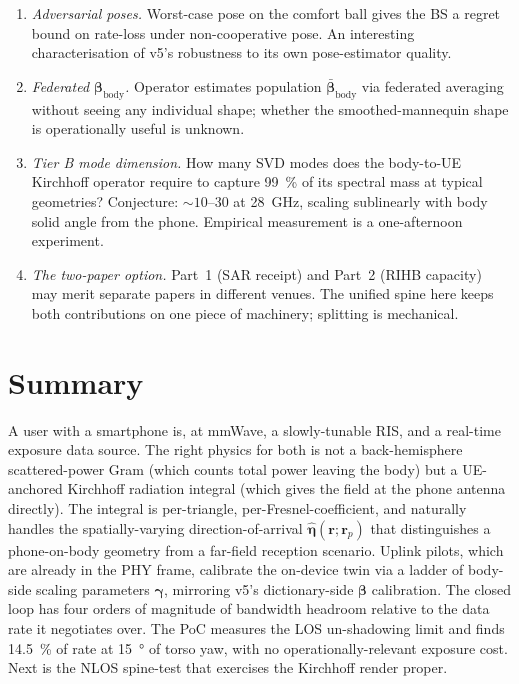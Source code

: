 \documentclass[11pt,a4paper]{article}
\theoremstyle{definition}
\newcommand{\etahat}{\hat{\bm{\eta}}}
\newcommand{\rr}{\mathbf{r}}
\begin{document}
\begin{enumerate}[leftmargin=1.6em,itemsep=3pt]
epidemiology that the field has been unable to run.  Study-design
question its own paper.
\item \emph{Adversarial poses.}  Worst-case pose on the comfort
ball gives the BS a regret bound on rate-loss under
non-cooperative pose.  An interesting characterisation of v5's
robustness to its own pose-estimator quality.
\item \emph{Federated $\bm\beta_{\mathrm{body}}$.}  Operator
estimates population $\bar{\bm\beta}_{\mathrm{body}}$ via federated
averaging without seeing any individual shape; whether the
smoothed-mannequin shape is operationally useful is unknown.
\item \emph{Tier B mode dimension.}  How many SVD modes does the
body-to-UE Kirchhoff operator require to capture
\SI{99}{\percent} of its spectral mass at typical
geometries?  Conjecture: $\sim 10$--$30$ at \SI{28}{GHz}, scaling
sublinearly with body solid angle from the phone.  Empirical
measurement is a one-afternoon experiment.
\item \emph{The two-paper option.}  Part~1 (SAR receipt) and
Part~2 (RIHB capacity) may merit separate papers in different
venues.  The unified spine here keeps both contributions on one
piece of machinery; splitting is mechanical.
\end{enumerate}

\section{Summary}\label{sec:sum}

A user with a smartphone is, at mmWave, a slowly-tunable RIS, and
a real-time exposure data source.  The right physics for both is
not a back-hemisphere scattered-power Gram (which counts total
power leaving the body) but a UE-anchored Kirchhoff radiation
integral (which gives the field at the phone antenna directly).
The integral is per-triangle, per-Fresnel-coefficient, and
naturally handles the spatially-varying direction-of-arrival
$\etahat(\rr;\rr_p)$ that distinguishes a phone-on-body geometry
from a far-field reception scenario.  Uplink pilots, which are
already in the PHY frame, calibrate the on-device twin via a
ladder of body-side scaling parameters $\bm\gamma$, mirroring v5's
dictionary-side $\bm\beta$ calibration.  The closed loop has four
orders of magnitude of bandwidth headroom relative to the data
rate it negotiates over.  The PoC measures the LOS un-shadowing
limit and finds \SI{14.5}{\percent} of rate at \SI{15}{\degree} of
torso yaw, with no operationally-relevant exposure cost.  Next is
the NLOS spine-test that exercises the Kirchhoff render proper.
\end{document}
